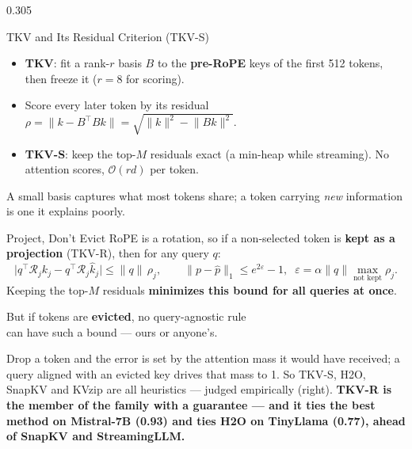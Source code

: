 \documentclass[final]{beamer}
\newcommand{\takeaway}[1]{%
  \begin{center}
  \colorbox{soft}{\parbox{0.96\linewidth}{\vspace{0.35cm}\centering\large #1\vspace{0.35cm}}}
  \end{center}}
\begin{document}
\begin{frame}[t]
\begin{columns}[t]
\begin{column}{0.305\paperwidth}
\begin{block}{TKV and Its Residual Criterion (TKV-S)}
\begin{center}
\end{center}
\vspace{0.2cm}
\begin{itemize}
  \item \textbf{TKV}: fit a rank-$r$ basis $B$ to the \textbf{pre-RoPE} keys of the first 512 tokens, then freeze it ($r{=}8$ for scoring).
  \item Score every later token by its residual $\rho = \lVert k - B^\top B k\rVert = \sqrt{\lVert k\rVert^2 - \lVert Bk\rVert^2}$.
  \item \textbf{TKV-S}: keep the top-$M$ residuals exact (a min-heap while streaming). No attention scores, $\mathcal{O}(rd)$ per token.
\end{itemize}
A small basis captures what most tokens share; a token carrying \emph{new}
information is one it explains poorly.
\end{block}

\begin{block}{Project, Don't Evict}
RoPE is a rotation, so if a non-selected token is \textbf{kept as a projection}
(TKV-R), then for any query $q$:
\[
\bigl|q^\top \mathcal{R}_j k_j - q^\top \mathcal{R}_j \hat k_j\bigr| \le \lVert q\rVert\,\rho_j,
\qquad \lVert p - \hat p\rVert_1 \le e^{2\varepsilon} - 1,\;\; \varepsilon = \alpha\lVert q\rVert\!\!\max_{\text{not kept}}\!\rho_j .
\]
Keeping the top-$M$ residuals \textbf{minimizes this bound for all queries at once}.
\vspace{0.25cm}
\takeaway{But if tokens are \textbf{evicted}, no query-agnostic rule\\ can have such a bound --- ours or anyone's.}
Drop a token and the error is set by the attention mass it would have received;
a query aligned with an evicted key drives that mass to 1. So TKV-S, H2O,
SnapKV and KVzip are all heuristics --- judged empirically (right).
\textbf{TKV-R is the member of the family with a guarantee --- and it ties the
best method on Mistral-7B (0.93) and ties H2O on TinyLlama (0.77), ahead of
SnapKV and StreamingLLM.}
\end{block}


\end{column}
\end{columns}
\end{frame}
\end{document}
